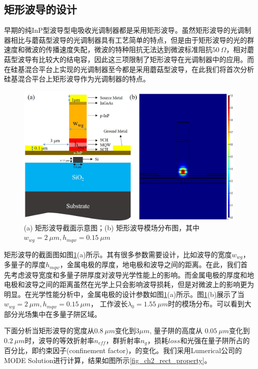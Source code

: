\subsection{矩形波导的设计}
早期的纯InP型波导型电吸收光调制器都是采用矩形波导\cite{zhang1999traveling,Robertphd,yuphd}。虽然矩形波导的光调制器相比与蘑菇型波导的光调制器具有工艺简单的特点\cite{chiu2005enhanced}，但是由于矩形波导的光的群速度和微波的传播速度失配，微波的特种阻抗无法达到微波标准阻抗$50 ~\Omega$，相对蘑菇型波导有比较大的结电容，因此这三项限制了矩形波导在光调制器中的应用。而在硅基混合平台上实现的光调制器至今都是采用蘑菇型波导\cite{kuo2008high, tang201150, tang2012over, tang2012energy, chen2011forty, fu20155}，在此我们将首次分析硅基混合平台上矩形波导作为光调制器的特点。
\begin{figure}[htb]
	\centering
	\includegraphics[width=12cm]{./Pictures/fig_ch2_rect_structure_mode.jpg}
	\caption{(a) 矩形波导截面示意图；(b) 矩形波导模场分布图，其中$w_{wg} = 2~ \mu m, h_{mqw} = 0.15 ~\mu m$}
	\label{fig_ch2_rect_structure_mode}
\end{figure}

矩形波导的截面图如图\ref{fig_ch2_rect_structure_mode}(a)所示。其有很多参数需要设计，比如波导的宽度$w_{wg}$，多量子的厚度$h_{mqw}$，金属电极的厚度，地电极和波导之间的距离。在此，我们首先考虑波导宽度和多量子阱厚度对波导光学性能上的影响。而金属电极的厚度和地电极和波导之间的距离虽然在光学上只会影响波导损耗，但是对微波上的影响更为明显。在光学性能分析中，金属电极的设计参数如图\ref{fig_ch2_rect_structure_mode}(a)所示。图\ref{fig_ch2_rect_structure_mode}(b)展示了当$w_{wg} = 2 ~\mu m, h_{mqw} = 0.15 ~\mu m$， 工作波长$\lambda_0 = 1.55~\mu m$时的模场分布。可以看到大部分光场集中在多量子阱区域。


下面分析当矩形波导的宽度从$0.8 ~\mu m$变化到$3 \mu m$, 量子阱的高度从 $0.05 ~\mu m$变化到$0.2 ~\mu m$时，波导的等效折射率$n_{eff}$，群折射率$n_g$，损耗$loss$和光强在量子阱所占的百分比，即约束因子(confinement factor)，的变化。我们采用Lumerical公司的MODE Solution进行计算\cite{modesolution}，结果如图所示\ref{fig_ch2_rect_property}。

